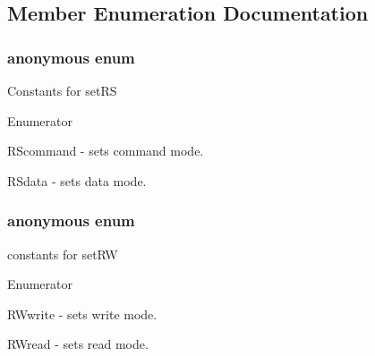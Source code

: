 \subsection{Member Enumeration Documentation}
\hypertarget{class_h_d44780phy_a76851a61a3a88766704db9f31098d21f}{\subsubsection[{anonymous enum}]{\setlength{\rightskip}{0pt plus 5cm}anonymous enum}}\label{class_h_d44780phy_a76851a61a3a88766704db9f31098d21f}
Constants for set\-R\-S \begin{Desc}
\item[Enumerator]\par
\begin{description}
\item[{\em 
\hypertarget{class_h_d44780phy_a76851a61a3a88766704db9f31098d21fac3d8b04a4b6fa7db3d0bfc61170e1d72}{R\-Scommand}\label{class_h_d44780phy_a76851a61a3a88766704db9f31098d21fac3d8b04a4b6fa7db3d0bfc61170e1d72}
}]R\-Scommand -\/ sets command mode. \item[{\em 
\hypertarget{class_h_d44780phy_a76851a61a3a88766704db9f31098d21fa2108dbcf0cc7b6cdcbc6235a4e765654}{R\-Sdata}\label{class_h_d44780phy_a76851a61a3a88766704db9f31098d21fa2108dbcf0cc7b6cdcbc6235a4e765654}
}]R\-Sdata -\/ sets data mode. \end{description}
\end{Desc}
\hypertarget{class_h_d44780phy_a5bf3a330184d4cfdc6297c1265ce6746}{\subsubsection[{anonymous enum}]{\setlength{\rightskip}{0pt plus 5cm}anonymous enum}}\label{class_h_d44780phy_a5bf3a330184d4cfdc6297c1265ce6746}
constants for set\-R\-W \begin{Desc}
\item[Enumerator]\par
\begin{description}
\item[{\em 
\hypertarget{class_h_d44780phy_a5bf3a330184d4cfdc6297c1265ce6746ac7b87f6864ebbc4bef3d14967ec3bc97}{R\-Wwrite}\label{class_h_d44780phy_a5bf3a330184d4cfdc6297c1265ce6746ac7b87f6864ebbc4bef3d14967ec3bc97}
}]R\-Wwrite -\/ sets write mode. \item[{\em 
\hypertarget{class_h_d44780phy_a5bf3a330184d4cfdc6297c1265ce6746a2777116400417dda3d881ec137a361fc}{R\-Wread}\label{class_h_d44780phy_a5bf3a330184d4cfdc6297c1265ce6746a2777116400417dda3d881ec137a361fc}
}]R\-Wread -\/ sets read mode. \end{description}
\end{Desc}


